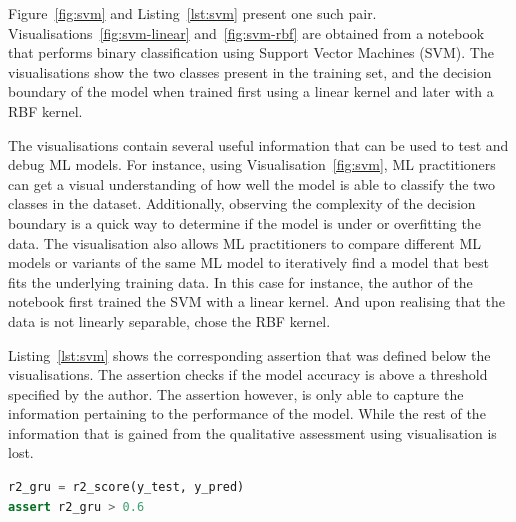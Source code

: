 \documentclass[conference]{IEEEtran}
\begin{document}
Figure~\ref{fig:svm} and Listing~\ref{lst:svm} present one such pair. Visualisations~\ref{fig:svm-linear} and~\ref{fig:svm-rbf} are obtained from a notebook that performs binary classification using Support Vector Machines (SVM). The visualisations show the two classes present in the training set, and the decision boundary of the model when trained first using a linear kernel and later with a RBF kernel.

The visualisations contain several useful information that can be used to test and debug ML models. For instance, using Visualisation~\ref{fig:svm}, ML practitioners can get a visual understanding of how well the model is able to classify the two classes in the dataset. Additionally, observing the complexity of the decision boundary is a quick way to determine if the model is under or overfitting the data. The visualisation also allows ML practitioners to compare different ML models or variants of the same ML model to iteratively find a model that best fits the underlying training data. In this case for instance, the author of the notebook first trained the SVM with a linear kernel. And upon realising that the data is not linearly separable, chose the RBF kernel.

Listing~\ref{lst:svm} shows the corresponding assertion that was defined below the visualisations. The assertion checks if the model accuracy is above a threshold specified by the author. The assertion however, is only able to capture the information pertaining to the performance of the model. While the rest of the information that is gained from the qualitative assessment using visualisation is lost.

\begin{lstlisting}[language=Python, caption={Assertion to check that the Coefficient of Determination ($R^2$) is higher than the specified threshold.}, label={lst:r2}]
r2_gru = r2_score(y_test, y_pred)
assert r2_gru > 0.6
\end{lstlisting}
\end{document}
